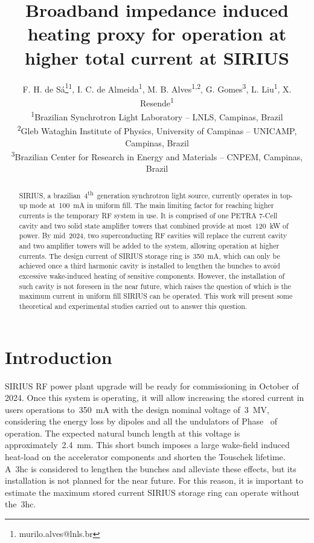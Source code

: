 \documentclass
[
    a4paper,
    nospread,     %
]{jacow}
\newcommand*{\rom}[1]{\uppercase\expandafter{\romannumeral#1\relax}}
\begin{document}
\title{Broadband impedance induced heating proxy for operation at higher total current at SIRIUS}
\author
{
    F. H. de Sá\thanks{murilo.alves@lnls.br}\textsuperscript{1},
    I. C. de Almeida\textsuperscript{1},
    M. B. Alves\textsuperscript{1,2},
    G. Gomes\textsuperscript{3},
    L. Liu\textsuperscript{1},
    X. Resende\textsuperscript{1}\\
    \textsuperscript{1}Brazilian Synchrotron Light Laboratory -- LNLS, Campinas, Brazil\\
    \textsuperscript{2}Gleb Wataghin Institute of Physics, University of Campinas -- UNICAMP, Campinas, Brazil\\
    \textsuperscript{3}Brazilian Center for Research in Energy and Materials -- CNPEM, Campinas, Brazil
}
\maketitle

\begin{abstract}
    SIRIUS, a brazilian~4\textsuperscript{th}~generation synchrotron light source, currently operates in top-up mode at~\SI{100}{\milli\ampere} in uniform fill. The main limiting factor for reaching higher currents is the temporary RF system in use. It is comprised of one PETRA 7-Cell cavity and two solid state amplifier towers that combined provide at most~\SI{120}{\kilo\watt} of power. By mid~\num{2024}, two superconducting RF cavities will replace the current cavity and two amplifier towers will be added to the system, allowing operation at higher currents. The design current of SIRIUS storage ring is~\SI{350}{\milli\ampere}, which can only be achieved once a third harmonic cavity is installed to lengthen the bunches to avoid excessive wake-induced heating of sensitive components. However, the installation of such cavity is not foreseen in the near future, which raises the question of which is the maximum current in uniform fill SIRIUS can be operated. This work will present some theoretical and experimental studies carried out to answer this question.
\end{abstract} 

\section{Introduction}
    SIRIUS RF power plant upgrade will be ready for commissioning in October of 2024. Once this system is operating, it will allow increasing the stored current in users operations to~\SI{350}{\milli\ampere} with the design nominal voltage of~\SI{3}{\mega\volt}, considering the energy loss by dipoles and all the undulators of Phase~\rom{1} of operation. The expected natural bunch length at this voltage is approximately~\SI{2.4}{\milli\meter}. This short bunch imposes a large wake-field induced heat-load on the accelerator components and shorten the Touschek lifetime. A~\gls{3hc} is considered to lengthen the bunches and alleviate these effects, but its installation is not planned for the near future. For this reason, it is important to estimate the maximum stored current SIRIUS storage ring can operate without the~\gls{3hc}.
\end{document}
